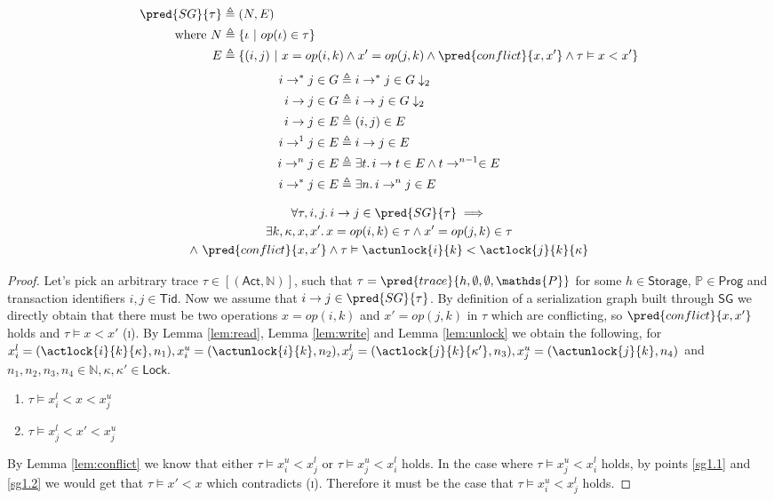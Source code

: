 \begin{align*}
\pred{SG}{\tau} &\triangleq (N, E) \\
\text{where } N &\triangleq \{ \iota\ |\ op(\iota) \in \tau \} \\
E &\triangleq \{ (i, j)\ |\ x = op(i, k) \land x' = op(j, k) \land \pred{conflict}{x, x'} \land \tau \vDash x < x' \}
\end{align*}
\begin{align*}
i \rightarrow^* j \in G &\triangleq i \rightarrow^* j \in G \downarrow_2
\\
i \rightarrow j \in G &\triangleq i \rightarrow j \in G \downarrow_2
\\
i \rightarrow j \in E &\triangleq (i, j) \in E
\\
i \rightarrow^1 j \in E &\triangleq i \rightarrow j \in E
\\
i \rightarrow^n j \in E &\triangleq \exists t \ldotp i \rightarrow t \in E \land t \rightarrow^{n-1} \in E
\\
i \rightarrow^* j \in E &\triangleq \exists n \ldotp i \rightarrow^n j \in E
\end{align*}

\lem \label{lem:sg1}
\begin{gather*}
\forall \tau, i, j \ldotp i \rightarrow j \in \pred{SG}{\tau} \implies \\
\exists k, \kappa, x, x' \ldotp x = op(i, k) \in \tau \land x' = op(j, k) \in \tau \\
\land\ \pred{conflict}{x, x'} \land \tau \vDash \actunlock{i}{k} < \actlock{j}{k}{\kappa}
\end{gather*}
\begin{proof}
Let's pick an arbitrary trace $\tau \in [(\mathsf{Act}, \mathds{N})]$, such that $\tau = \pred{trace}{h, \emptyset, \emptyset, \mathds{P}}$ for some $h \in \mathsf{Storage}$, $\mathds{P} \in \mathsf{Prog}$ and transaction identifiers $i, j \in \mathsf{Tid}$. Now we assume that $i \rightarrow j \in \pred{SG}{\tau}$. By definition of a serialization graph built through $\mathsf{SG}$ we directly obtain that there must be two operations $x = op(i, k)$ and $x' = op(j, k)$ in $\tau$ which are conflicting, so $\pred{conflict}{x, x'}$ holds and $\tau \vDash x < x'$ (\textsc{i}). By Lemma \ref{lem:read}, Lemma \ref{lem:write} and Lemma \ref{lem:unlock} we obtain the following, for $x_i^l = (\actlock{i}{k}{\kappa}, n_1), x_i^u = (\actunlock{i}{k}, n_2), x_j^l = (\actlock{j}{k}{\kappa'}, n_3), x_j^u = (\actunlock{j}{k}, n_4)$ and $n_1, n_2, n_3, n_4 \in \mathds{N}, \kappa, \kappa' \in \mathsf{Lock}$.
\begin{enumerate}
\item \label{sg1.1} $\tau \vDash x_i^l < x < x_j^u$
\item \label{sg1.2} $\tau \vDash x_j^l < x' < x_j^u$
\end{enumerate}
By Lemma \ref{lem:conflict} we know that either $\tau \vDash x_i^u < x_j^l$ or $\tau \vDash x_j^u < x_i^l$ holds. In the case where $\tau \vDash x_j^u < x_i^l$ holds, by points \ref{sg1.1} and \ref{sg1.2} we would get that $\tau \vDash x' < x$ which contradicts (\textsc{i}). Therefore it must be the case that $\tau \vDash x_i^u < x_j^l$ holds.
\end{proof}

